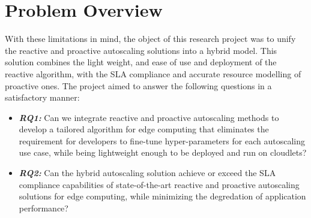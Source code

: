 \section{Problem Overview}
\label{sec:problem-overview}

With these limitations in mind, the object of this research project was to unify the reactive and proactive autoscaling solutions into a hybrid model. This solution combines the light weight, and ease of use and deployment of the reactive algorithm, with the SLA compliance and accurate resource modelling of proactive ones. The project aimed to answer the following questions in a satisfactory manner:
\begin{itemize}
    \item \textbf{\textit{RQ1:}} Can we integrate reactive and proactive autoscaling methods to develop a tailored algorithm for edge computing that eliminates the requirement for developers to fine-tune hyper-parameters for each autoscaling use case, while being lightweight enough to be deployed and run on cloudlets?
    \item \textbf{\textit{RQ2:}} Can the hybrid autoscaling solution achieve or exceed the SLA compliance capabilities of state-of-the-art reactive and proactive autoscaling solutions for edge computing, while minimizing the degredation of application performance?
\end{itemize}